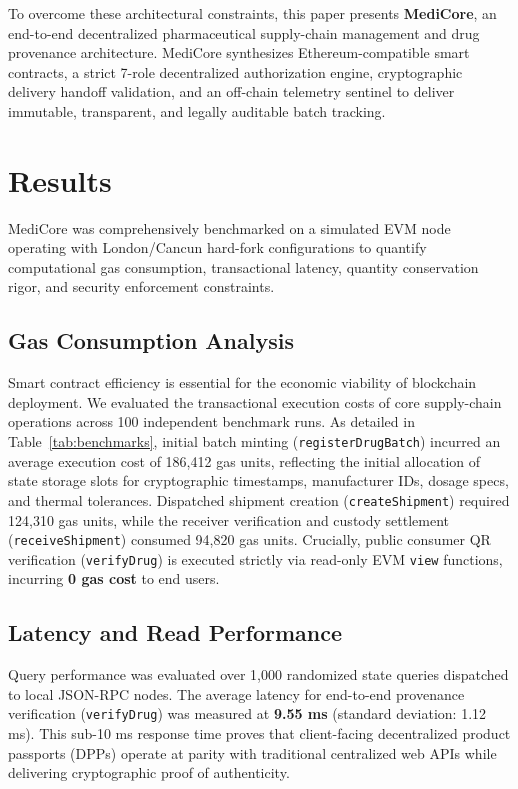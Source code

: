 \documentclass[11pt,a4paper]{article}
\begin{document}
To overcome these architectural constraints, this paper presents \textbf{MediCore}, an end-to-end decentralized pharmaceutical supply-chain management and drug provenance architecture. MediCore synthesizes Ethereum-compatible smart contracts, a strict 7-role decentralized authorization engine, cryptographic delivery handoff validation, and an off-chain telemetry sentinel to deliver immutable, transparent, and legally auditable batch tracking.

\section{Results}
MediCore was comprehensively benchmarked on a simulated EVM node operating with London/Cancun hard-fork configurations to quantify computational gas consumption, transactional latency, quantity conservation rigor, and security enforcement constraints.

\subsection{Gas Consumption Analysis}
Smart contract efficiency is essential for the economic viability of blockchain deployment. We evaluated the transactional execution costs of core supply-chain operations across 100 independent benchmark runs. As detailed in Table~\ref{tab:benchmarks}, initial batch minting (\texttt{registerDrugBatch}) incurred an average execution cost of 186,412 gas units, reflecting the initial allocation of state storage slots for cryptographic timestamps, manufacturer IDs, dosage specs, and thermal tolerances. Dispatched shipment creation (\texttt{createShipment}) required 124,310 gas units, while the receiver verification and custody settlement (\texttt{receiveShipment}) consumed 94,820 gas units. Crucially, public consumer QR verification (\texttt{verifyDrug}) is executed strictly via read-only EVM \texttt{view} functions, incurring \textbf{0 gas cost} to end users.

\subsection{Latency and Read Performance}
Query performance was evaluated over 1,000 randomized state queries dispatched to local JSON-RPC nodes. The average latency for end-to-end provenance verification (\texttt{verifyDrug}) was measured at \textbf{9.55 ms} (standard deviation: 1.12 ms). This sub-10 ms response time proves that client-facing decentralized product passports (DPPs) operate at parity with traditional centralized web APIs while delivering cryptographic proof of authenticity.
\end{document}
